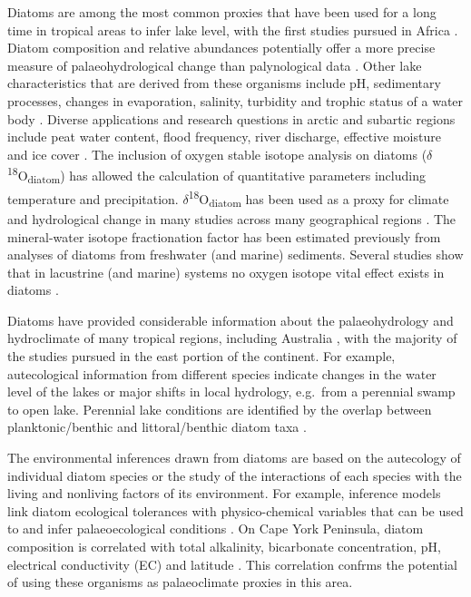 \documentclass[
  12pt,
]{book}
\begin{document}
Diatoms are among the most common proxies that have been used for a long time in tropical areas to infer lake level, with the first studies pursued in Africa \citep{gasseLateQuaternaryLakelevel1978, gasseDiatomsReconstructingPalaeoenvironments1987}. Diatom composition and relative abundances potentially offer a more precise measure of palaeohydrological change than palynological data \citep{prebbleHolocenePollenDiatom2005, wolinDiatomsIndicatorsWaterlevel2010}. Other lake characteristics that are derived from these organisms include pH, sedimentary processes, changes in evaporation, salinity, turbidity and trophic status of a water body \citep{proskeHoloceneDiatomRecords2017a}. Diverse applications and research questions in arctic and subartic regions include peat water content, flood frequency, river discharge, effective moisture and ice cover \citep{moserPaleohydrologyInferredDiatoms2000}. The inclusion of oxygen stable isotope analysis on diatoms (\(\delta\)\textsuperscript{18}O\textsubscript{diatom}) has allowed the calculation of quantitative parameters including temperature and precipitation. \(\delta\)\textsuperscript{18}O\textsubscript{diatom} has been used as a proxy for climate and hydrological change in many studies across many geographical regions \citep{lengRecentAdvancesIsotopes2013, lengReviewOxygenIsotope2006}. The mineral-water isotope fractionation factor has been estimated previously from analyses of diatoms from freshwater (and marine) sediments. Several studies show that in lacustrine (and marine) systems no oxygen isotope vital effect exists in diatoms \citep{lengReviewOxygenIsotope2006}.

Diatoms have provided considerable information about the palaeohydrology and hydroclimate of many tropical regions, including Australia \citep{lulyHolocenePalaeoenvironmentsChange2006, prebbleHolocenePollenDiatom2005, proskeHoloceneDiatomRecords2017a, tibbyLateGlacialPresent2007}, with the majority of the studies pursued in the east portion of the continent. For example, autecological information from different species indicate changes in the water level of the lakes \citep{proskeHoloceneDiatomRecords2017a, tibbyLateGlacialPresent2007} or major shifts in local hydrology, e.g.~from a perennial swamp to open lake. Perennial lake conditions are identified by the overlap between planktonic/benthic and littoral/benthic diatom taxa \citep{prebbleHolocenePollenDiatom2005}.

The environmental inferences drawn from diatoms are based on the autecology of individual diatom species or the study of the interactions of each species with the living and nonliving factors of its environment. For example, inference models link diatom ecological tolerances with physico-chemical variables that can be used to and infer palaeoecological conditions \citep{battarbeeDiatoms2002}. On Cape York Peninsula, diatom composition is correlated with total alkalinity, bicarbonate concentration, pH, electrical conductivity (EC) and latitude \citep{negusSubtleVariabilityWater2019}. This correlation confrms the potential of using these organisms as palaeoclimate proxies in this area.
\end{document}
